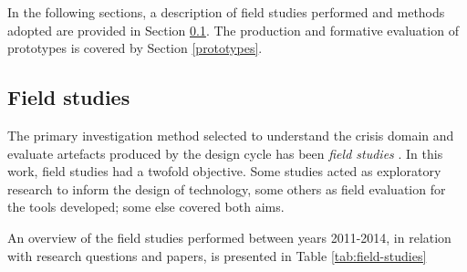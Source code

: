 In the following sections, a description of field studies performed and methods adopted are provided in Section \ref{field-studies}. The production and formative evaluation of prototypes is covered by Section \ref{prototypes}.

\subsection{Field studies}\label{field-studies}

The primary investigation method selected to understand the crisis domain and evaluate artefacts produced by the design cycle has been \emph{field studies} \autocite{robson1993real}. In this work, field studies had a twofold objective. Some studies acted as exploratory research to inform the design of technology, some others as field evaluation for the tools developed; some else covered both aims.

An overview of the field studies performed between years 2011-2014, in relation with research questions and papers, is presented in Table \ref{tab:field-studies}

